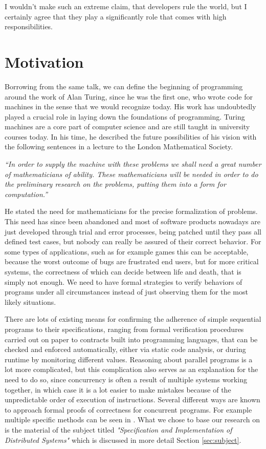 I wouldn't make such an extreme claim, that developers rule the world, but I certainly agree that they play a significantly role that comes with high responsibilities.

\section{Motivation}

Borrowing from the same talk, we can define the beginning of programming around the work of Alan Turing, since he was the first one, who wrote code for machines in the sense that we would recognize today. His work has undoubtedly played a crucial role in laying down the foundations of programming. Turing machines are a core part of computer science and are still taught in university courses today. In his time, he described the future possibilities of his vision with the following sentences in a lecture to the London Mathematical Society\cite{turing-lecture}.

\textit{``In order to supply the machine with these problems we shall need a great number of mathematicians of ability. These mathematicians will be needed in order to do the preliminary research on the problems, putting them into a form for computation.''}

He stated the need for mathematicians for the precise formalization of problems. This need has since been abandoned and most of software products nowadays are just developed through trial and error processes, being patched until they pass all defined test cases, but nobody can really be assured of their correct behavior. For some types of applications, such as for example games this can be acceptable, because the worst outcome of bugs are frustrated end users, but for more critical systems, the correctness of which can decide between life and death, that is simply not enough. We need to have formal strategies to verify behaviors of programs under all circumstances instead of just observing them for the most likely situations.

There are lots of existing means for confirming the adherence of simple sequential programs to their specifications, ranging from formal verification procedures carried out on paper to contracts built into programming languages, that can be checked and enforced automatically, either via static code analysis, or during runtime by monitoring different values. Reasoning about parallel programs is a lot more complicated, but this complication also serves as an explanation for the need to do so, since concurrency is often a result of multiple systems working together, in which case it is a lot easier to make mistakes because of the unpredictable order of execution of instructions. Several different ways are known to approach formal proofs of correctness for concurrent programs. For example multiple specific methods can be seen in \cite{hons_1202}. What we chose to base our research on is the material of the subject titled \textit{"Specification and Implementation of Distributed Systems"} which is discussed in more detail Section \ref{sec:subject}.

